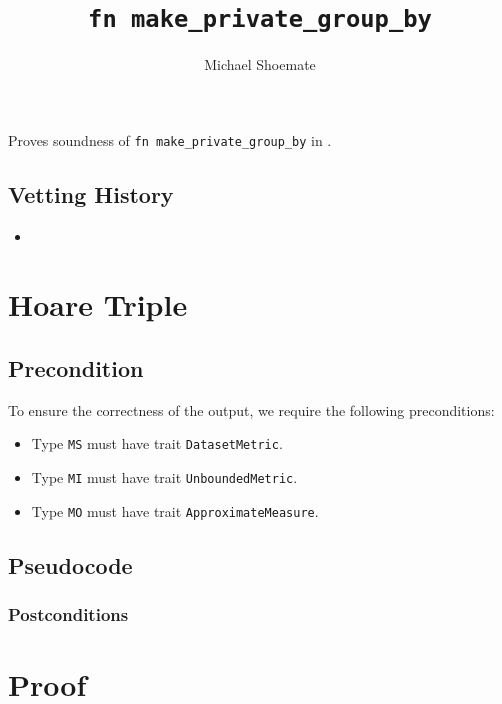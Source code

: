 \documentclass{article}
\title{\texttt{fn make\_private\_group\_by}}
\author{Michael Shoemate}
\date{}
\begin{document}
\maketitle

\contrib
Proves soundness of \texttt{fn make\_private\_group\_by} in .

\subsection*{Vetting History}
\begin{itemize}
    \item {}
\end{itemize}

\section{Hoare Triple}
\subsection*{Precondition}
To ensure the correctness of the output, we require the following preconditions:

\begin{itemize}
    \item Type \texttt{MS} must have trait \texttt{DatasetMetric}.
    \item Type \texttt{MI} must have trait \texttt{UnboundedMetric}.
    \item Type \texttt{MO} must have trait \texttt{ApproximateMeasure}.
\end{itemize}

\subsection*{Pseudocode}


\subsubsection*{Postconditions}

\section{Proof}
\end{document}
